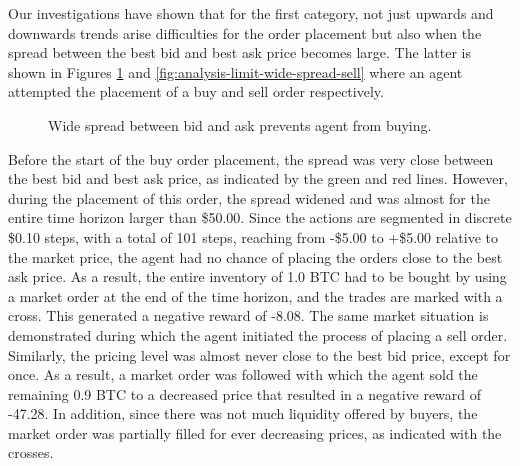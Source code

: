 Our investigations have shown that for the first category, not just upwards and downwards trends arise difficulties for the order placement but also when the spread between the best bid and best ask price becomes large.
The latter is shown in Figures \ref{fig:analysis-limit-wide-spread-buy} and \ref{fig:analysis-limit-wide-spread-sell} where an agent attempted the placement of a buy and sell order respectively.
\begin{figure}[H]
    \centering
    \caption{Wide spread between bid and ask prevents agent from buying.}
    \label{fig:analysis-limit-wide-spread-buy}
\end{figure}
Before the start of the buy order placement, the spread was very close between the best bid and best ask price, as indicated by the green and red lines.
However, during the placement of this order, the spread widened and was almost for the entire time horizon larger than \$50.00.
Since the actions are segmented in discrete \$0.10 steps, with a total of 101 steps, reaching from -\$5.00 to +\$5.00 relative to the market price, the agent had no chance of placing the orders close to the best ask price.
As a result, the entire inventory of 1.0 BTC had to be bought by using a market order at the end of the time horizon, and the trades are marked with a cross.
This generated a negative reward of -8.08.
The same market situation is demonstrated during which the agent initiated the process of placing a sell order.
Similarly, the pricing level was almost never close to the best bid price, except for once.
As a result, a market order was followed with which the agent sold the remaining 0.9 BTC to a decreased price that resulted in a negative reward of -47.28.
In addition, since there was not much liquidity offered by buyers, the market order was partially filled for ever decreasing prices, as indicated with the crosses.

